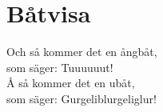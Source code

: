 \section{Båtvisa}
Och så kommer det en ångbåt,\\
som säger: Tuuuuuut!\\

Å så kommer det en ubåt,\\
som säger: Gurgeliblurgeliglur!\\